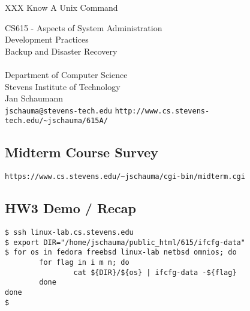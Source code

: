 \documentclass[xga]{xdvislides}
\begin{document}
\setfontphv

\lhead{\slidetitle}                               %
\cfoot{\relax}                               %
\rfoot{\Gray{\today}}

\newcommand{\smallish}{\fontsize{15}{20}\selectfont}

XXX Know A Unix Command

\vspace*{\fill}
\begin{center}
	\Hugesize
		CS615 - Aspects of System Administration\\ [1em]
		Development Practices \\ [1em]
		Backup and Disaster Recovery \\ [1em]
	\hspace*{5mm}\blueline\\ [1em]
	\Normalsize
		Department of Computer Science\\
		Stevens Institute of Technology\\
		Jan Schaumann\\
		\verb+jschauma@stevens-tech.edu+
		\verb+http://www.cs.stevens-tech.edu/~jschauma/615A/+
\end{center}
\vspace*{\fill}

\subsection{Midterm Course Survey}
\vspace*{\fill}
{\tt https://www.cs.stevens.edu/\~{}jschauma/cgi-bin/midterm.cgi}
\vspace*{\fill}


\subsection{HW3 Demo / Recap}
\begin{verbatim}
$ ssh linux-lab.cs.stevens.edu
$ export DIR="/home/jschauma/public_html/615/ifcfg-data"
$ for os in fedora freebsd linux-lab netbsd omnios; do
        for flag in i m n; do
                cat ${DIR}/${os} | ifcfg-data -${flag}
        done
done
$
\end{verbatim}
\end{document}
